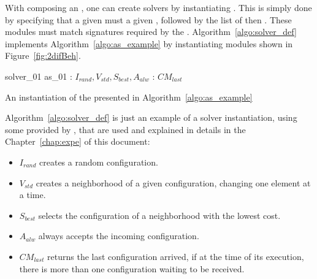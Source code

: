 

With \bothmodules{} composing an \as, one can create solvers by instantiating \ms. This is simply done by specifying that a given \mbox{} must \mbox{} a given \as, followed by the list of \omprefix{} then \opchs{}. These modules must match signatures required by the \as. Algorithm~\ref{algo:solver_def} implements Algorithm~\ref{algo:as_example} by instantiating modules shown in Figure~\ref{fig:2difBeh}.

\begin{algorithm}[H]
\dontprintsemicolon
\SetNoline
{}
 solver\_01  as\_01\;
 : $I_{rand}, V_{std}, S_{best}, A_{alw}$ \; 
: $CM_{last}$\; %
\caption{An instantiation of the \as{} presented in Algorithm~\ref{algo:as_example}}\label{algo:solver_def}
\end{algorithm}

Algorithm~\ref{algo:solver_def} is just an example of a solver instantiation, using some \oms{} provided by \posl{}, that are used and explained in details in the Chapter~\ref{chap:expe} of this document:
\begin{itemize}
\item $I_{rand}$ creates a random configuration.
\item $V_{std}$ creates a neighborhood of a given configuration, changing one element at a time.
\item $S_{best}$ selects the configuration of a neighborhood with the lowest cost.
\item $A_{alw}$ always accepts the incoming configuration.
\item $CM_{last}$ returns the last configuration arrived, if at the time of its execution, there is more than one configuration waiting to be received. 
\end{itemize}